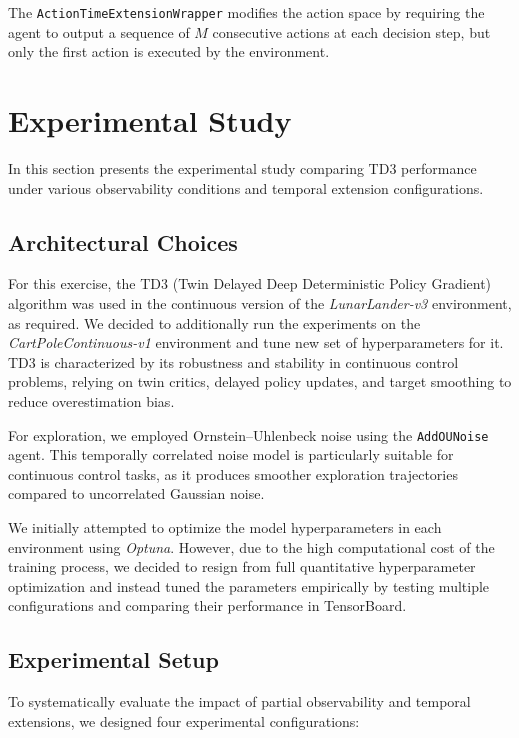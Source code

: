 \documentclass[12pt, a4paper]{article}
\begin{document}
The \texttt{ActionTimeExtensionWrapper} modifies the action space by requiring the agent to output a sequence of $M$ consecutive actions at each decision step, but only the first action is executed by the environment. 



\section{Experimental Study}

In this section presents the experimental study comparing TD3 performance under various observability conditions and temporal extension configurations.

\subsection{Architectural Choices}

For this exercise, the TD3 (Twin Delayed Deep Deterministic Policy Gradient) algorithm was used in the continuous version of the \textit{LunarLander-v3} environment, as required. We decided to additionally run the experiments on the \textit{CartPoleContinuous-v1} environment and tune new set of hyperparameters for it. TD3 is characterized by its robustness and stability in continuous control problems, relying on twin critics, delayed policy updates, and target smoothing to reduce overestimation bias.\newline

For exploration, we employed Ornstein–Uhlenbeck noise using the \texttt{AddOUNoise} agent. This temporally correlated noise model is particularly suitable for continuous control tasks, as it produces smoother exploration trajectories compared to uncorrelated Gaussian noise. \newline

We initially attempted to optimize the model hyperparameters in each environment using \textit{Optuna}. However, due to the high computational cost of the training process, we decided to resign from full quantitative hyperparameter optimization and instead tuned the parameters empirically by testing multiple configurations and comparing their performance in TensorBoard.

\subsection{Experimental Setup}

To systematically evaluate the impact of partial observability and temporal extensions, we designed four experimental configurations:
\end{document}
